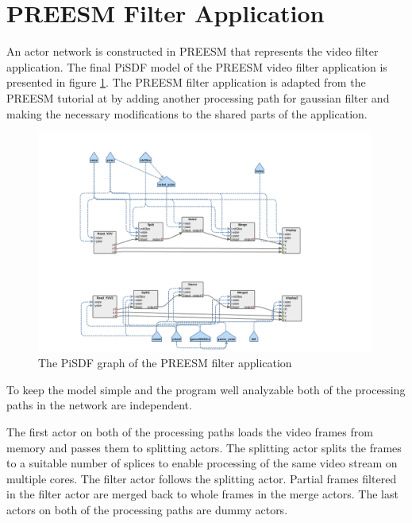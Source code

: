 \section{PREESM Filter Application}
\label{sec:preesmapp}
An actor network is constructed in PREESM that represents the video filter
application. The final PiSDF model of the PREESM video filter application is
presented in figure \ref{preesm_actors}. The PREESM filter application is
adapted from the PREESM tutorial at \cite{preesmtut} by adding another
processing path for gaussian filter and making the necessary modifications to
the shared parts of the application.

\begin{figure}[h!] \label{preesm_actors} \begin{center}
    \includegraphics[width=0.99\textwidth]{images/preesm_diagram.png}
    \caption{The PiSDF graph of the PREESM filter application} \end{center}
\end{figure}

To keep the model simple and the program well analyzable both of the processing
paths in the network are independent.

The first actor on both of the processing paths loads the video frames from
memory and passes them to splitting actors. The splitting actor splits the
frames to a suitable number of splices to enable processing of the same video
stream on multiple cores. The filter actor follows the splitting actor. Partial
frames filtered in the filter actor are merged back to whole frames in the merge
actors. The last actors on both of the processing paths are dummy actors.\\

